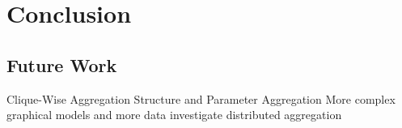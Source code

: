 
\chapter{Conclusion}
\label{chapter:ch6}

\section{Future Work}
Clique-Wise Aggregation
Structure and Parameter Aggregation
More complex graphical models and more data
investigate distributed aggregation 
